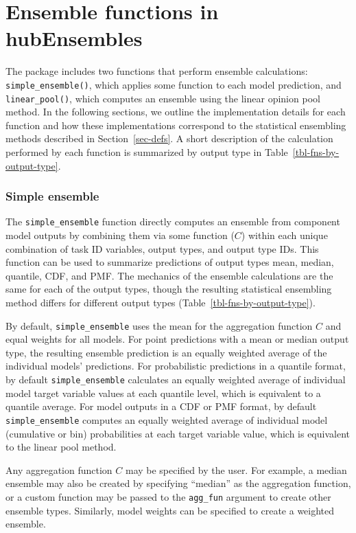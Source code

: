 \documentclass[
  article,
  shortnames,
  notitle]{jss}
\begin{document}
\section{Ensemble functions in hubEnsembles}\label{sec-ens-fns}

The  package includes two functions that perform
ensemble calculations: \texttt{simple\_ensemble()}, which applies some
function to each model prediction, and \texttt{linear\_pool()}, which
computes an ensemble using the linear opinion pool method. In the
following sections, we outline the implementation details for each
function and how these implementations correspond to the statistical
ensembling methods described in Section~\ref{sec-defs}. A short
description of the calculation performed by each function is summarized
by output type in Table~\ref{tbl-fns-by-output-type}.

\subsubsection{Simple ensemble}\label{simple-ensemble}

The \texttt{simple\_ensemble} function directly computes an ensemble
from component model outputs by combining them via some function (\(C\))
within each unique combination of task ID variables, output types, and
output type IDs. This function can be used to summarize predictions of
output types mean, median, quantile, CDF, and PMF. The mechanics of the
ensemble calculations are the same for each of the output types, though
the resulting statistical ensembling method differs for different output
types (Table~\ref{tbl-fns-by-output-type}).

By default, \texttt{simple\_ensemble} uses the mean for the aggregation
function \(C\) and equal weights for all models. For point predictions
with a mean or median output type, the resulting ensemble prediction is
an equally weighted average of the individual models' predictions. For
probabilistic predictions in a quantile format, by default
\texttt{simple\_ensemble} calculates an equally weighted average of
individual model target variable values at each quantile level, which is
equivalent to a quantile average. For model outputs in a CDF or PMF
format, by default \texttt{simple\_ensemble} computes an equally
weighted average of individual model (cumulative or bin) probabilities
at each target variable value, which is equivalent to the linear pool
method.

Any aggregation function \(C\) may be specified by the user. For
example, a median ensemble may also be created by specifying ``median''
as the aggregation function, or a custom function may be passed to the
\texttt{agg\_fun} argument to create other ensemble types. Similarly,
model weights can be specified to create a weighted ensemble.
\end{document}

